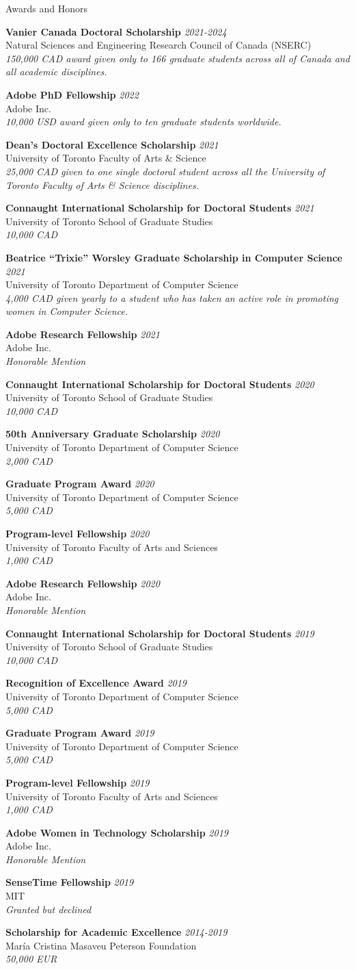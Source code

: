 \documentclass{resume}
\newcommand{\cvitembig}[4]{
    {\bf #1} \hfill {\em \small #2} \\ 
    {\small#3 }\\
    {\it \small #4}
}
\begin{document}
\begin{rSection}{Awards and Honors}

\cvitembig{Vanier Canada Doctoral Scholarship}{\em 2021-2024}{Natural Sciences and Engineering Research Council of Canada (NSERC)}{150,000 CAD award given only to 166 graduate students across all of Canada and all academic disciplines.}

\cvitembig{Adobe PhD Fellowship}{2022}{Adobe Inc.}{10,000 USD award given only to ten graduate students worldwide.}

\cvitembig{Dean's Doctoral Excellence Scholarship}{2021}{University of Toronto Faculty of Arts \& Science}{25,000 CAD given to one single doctoral student across all the University of Toronto Faculty of Arts \& Science disciplines.}

\cvitembig{Connaught International Scholarship for Doctoral Students}{2021}{University of Toronto School of Graduate Studies}{10,000 CAD}

\cvitembig{Beatrice ``Trixie'' Worsley Graduate Scholarship in Computer Science}{2021}{University of Toronto Department of Computer Science}{4,000 CAD given yearly to a student who has taken an active role in promoting women in Computer Science.}

\cvitembig{Adobe Research Fellowship}{2021}{Adobe Inc.}{Honorable Mention}

\cvitembig{Connaught International Scholarship for Doctoral Students}{2020}{University of Toronto School of Graduate Studies}{10,000 CAD}

\cvitembig{50th Anniversary Graduate Scholarship}{2020}{University of Toronto Department of Computer Science}{2,000 CAD}

\cvitembig{Graduate Program Award}{2020}{University of Toronto Department of Computer Science}{5,000 CAD}

\cvitembig{Program-level Fellowship}{2020}{University of Toronto Faculty of Arts and Sciences}{1,000 CAD}

\cvitembig{Adobe Research Fellowship}{2020}{Adobe Inc.}{Honorable Mention}

\cvitembig{Connaught International Scholarship for Doctoral Students}{2019}{University of Toronto School of Graduate Studies}{10,000 CAD}

\cvitembig{Recognition of Excellence Award}{2019}{University of Toronto Department of Computer Science}{5,000 CAD}

\cvitembig{Graduate Program Award}{2019}{University of Toronto Department of Computer Science}{5,000 CAD}

\cvitembig{Program-level Fellowship}{2019}{University of Toronto Faculty of Arts and Sciences}{1,000 CAD}

\cvitembig{Adobe Women in Technology Scholarship}{2019}{Adobe Inc.}{Honorable Mention}

\cvitembig{SenseTime Fellowship}{2019}{MIT}{Granted but declined}


\cvitembig{ Scholarship for Academic Excellence}{2014-2019}{Mar\'{i}a Cristina Masaveu Peterson Foundation}{50,000 EUR}

\end{rSection}
\end{document}
